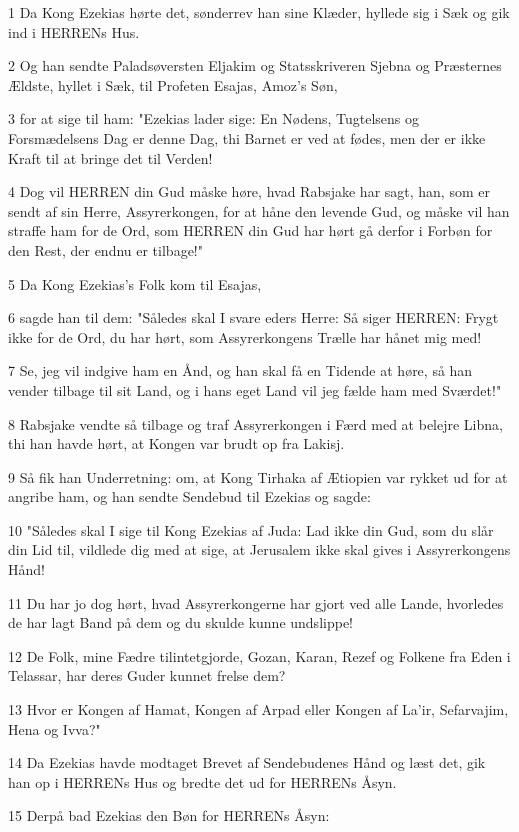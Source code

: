 \par 1 Da Kong Ezekias hørte det, sønderrev han sine Klæder, hyllede sig i Sæk og gik ind i HERRENs Hus.
\par 2 Og han sendte Paladsøversten Eljakim og Statsskriveren Sjebna og Præsternes Ældste, hyllet i Sæk, til Profeten Esajas, Amoz's Søn,
\par 3 for at sige til ham: "Ezekias lader sige: En Nødens, Tugtelsens og Forsmædelsens Dag er denne Dag, thi Barnet er ved at fødes, men der er ikke Kraft til at bringe det til Verden!
\par 4 Dog vil HERREN din Gud måske høre, hvad Rabsjake har sagt, han, som er sendt af sin Herre, Assyrerkongen, for at håne den levende Gud, og måske vil han straffe ham for de Ord, som HERREN din Gud har hørt gå derfor i Forbøn for den Rest, der endnu er tilbage!"
\par 5 Da Kong Ezekias's Folk kom til Esajas,
\par 6 sagde han til dem: "Således skal I svare eders Herre: Så siger HERREN: Frygt ikke for de Ord, du har hørt, som Assyrerkongens Trælle har hånet mig med!
\par 7 Se, jeg vil indgive ham en Ånd, og han skal få en Tidende at høre, så han vender tilbage til sit Land, og i hans eget Land vil jeg fælde ham med Sværdet!"
\par 8 Rabsjake vendte så tilbage og traf Assyrerkongen i Færd med at belejre Libna, thi han havde hørt, at Kongen var brudt op fra Lakisj.
\par 9 Så fik han Underretning: om, at Kong Tirhaka af Ætiopien var rykket ud for at angribe ham, og han sendte Sendebud til Ezekias og sagde:
\par 10 "Således skal I sige til Kong Ezekias af Juda: Lad ikke din Gud, som du slår din Lid til, vildlede dig med at sige, at Jerusalem ikke skal gives i Assyrerkongens Hånd!
\par 11 Du har jo dog hørt, hvad Assyrerkongerne har gjort ved alle Lande, hvorledes de har lagt Band på dem og du skulde kunne undslippe!
\par 12 De Folk, mine Fædre tilintetgjorde, Gozan, Karan, Rezef og Folkene fra Eden i Telassar, har deres Guder kunnet frelse dem?
\par 13 Hvor er Kongen af Hamat, Kongen af Arpad eller Kongen af La'ir, Sefarvajim, Hena og Ivva?"
\par 14 Da Ezekias havde modtaget Brevet af Sendebudenes Hånd og læst det, gik han op i HERRENs Hus og bredte det ud for HERRENs Åsyn.
\par 15 Derpå bad Ezekias den Bøn for HERRENs Åsyn:
